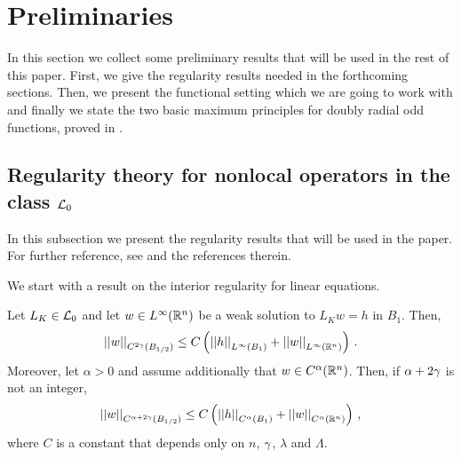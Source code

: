 \section{Preliminaries}
\label{Sec:Preliminaries}

In this section we collect some preliminary results that will be used in the rest of this paper. First, we give the regularity results needed in the forthcoming sections. Then, we present the functional setting which we are going to work with and finally we state the two basic maximum principles for doubly radial odd functions, proved in \cite{FelipeSanz-Perela:IntegroDifferentialI}.


\subsection{Regularity theory for nonlocal operators in the class $\mathcal{L}_0$}
\label{Subsec:Regularity}


In this subsection we present the regularity results that will be used in the paper. For further reference, see \cite{RosOton-Survey,SerraC2s+alphaRegularity} and the references therein. 


We start with a result on the interior regularity for linear equations.

\begin{proposition}
	\label{Prop:InteriorRegularity}
	Let $L_K \in\mathcal{L}_0$ and let $w\in L^\infty (\mathbb{R}^n)$ be a weak solution to $L_K w = h$ in $B_1$. Then,
	\begin{equation}
	\label{Eq:C2sEstimate}
	\left | \left |{w} \right | \right |_{C^{2\gamma} (B_{1/2})} \leq C\left ( {\left | \left |{h} \right | \right |_{L^\infty (B_1)} + \left | \left |{w} \right | \right |_{L^\infty  (\mathbb{R}^n)} }\right )\,.
	\end{equation}
	Moreover, let $\alpha > 0$ and assume additionally that $w \in C^\alpha (\mathbb{R}^n)$. Then, if $\alpha +
	2\gamma$ is not an integer,
	\begin{equation}
	\label{Eq:Calpha->Calpha+2sEstimate}
	\left | \left |{w} \right | \right |_{C^{\alpha + 2\gamma} (B_{1/2})} \leq C\left ( {\left | \left |{h} \right | \right |_{C^{\alpha} (B_1)} + \left | \left |{w} \right | \right |_{C^\alpha (\mathbb{R}^n)} }\right )\,,
	\end{equation}
	where $C$ is a constant that depends only on $n$, $\gamma$, $\lambda$ and $\Lambda$.
\end{proposition}


